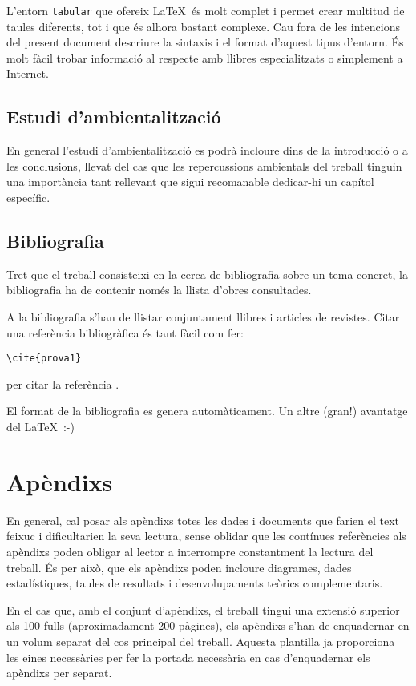 L'entorn \texttt{tabular} que ofereix \LaTeX \ és molt complet i permet crear multitud de taules diferents, tot i que és alhora bastant complexe. Cau fora de les intencions del present document descriure la sintaxis i el format d'aquest tipus d'entorn. És molt fàcil trobar informació al respecte amb llibres especialitzats o simplement a Internet. 


\subsection{Estudi d'ambientalització}

En general l'estudi d'ambientalització es podrà incloure dins de la introducció o a les conclusions, llevat del cas que les repercussions ambientals del treball tinguin una importància tant rellevant que sigui recomanable dedicar-hi un capítol específic.


\subsection{Bibliografia}

Tret que el treball consisteixi en la cerca de bibliografia sobre un tema concret, la bibliografia ha de contenir només la llista d'obres consultades.

A la bibliografia s'han de llistar conjuntament llibres i articles de revistes. Citar una referència bibliogràfica és tant fàcil com fer:

\begin{verbatim}
\cite{prova1}
\end{verbatim}

per citar la referència \cite{prova1}.

El format de la bibliografia es genera automàticament. Un altre (gran!) avantatge del \LaTeX \ :-)


\section{Apèndixs}

En general, cal posar als apèndixs totes les dades i documents que farien el text feixuc i dificultarien la seva lectura, sense oblidar que les contínues referències als apèndixs poden obligar al lector a interrompre constantment la lectura del treball. És per això, que els apèndixs poden incloure diagrames, dades estadístiques, taules de resultats i desenvolupaments teòrics complementaris.

En el cas que, amb el conjunt d'apèndixs, el treball tingui una extensió superior als 100 fulls (aproximadament 200 pàgines), els apèndixs s'han de enquadernar en un volum separat del cos principal del treball. Aquesta plantilla ja proporciona les eines necessàries per fer la portada necessària en cas d'enquadernar els apèndixs per separat.